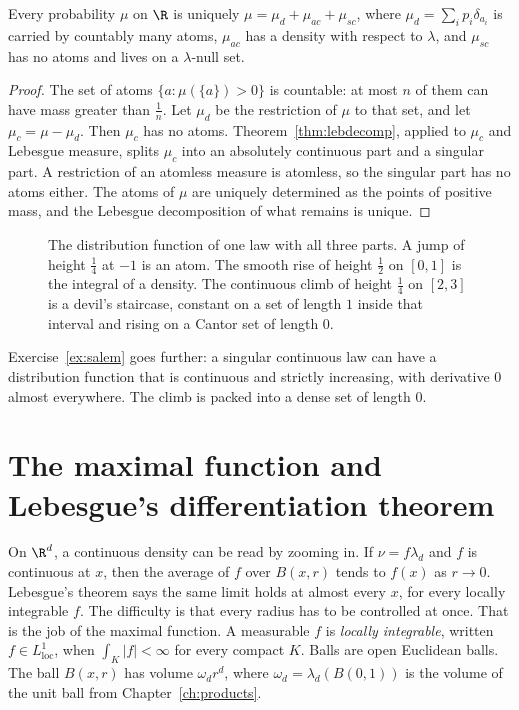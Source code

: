 \begin{corollary}\label{cor:threeparts}
Every probability $\mu$ on $\R$ is uniquely $\mu=\mu_d+\mu_{ac}+\mu_{sc}$, where $\mu_d=\sum_ip_i\delta_{a_i}$ is carried by countably many atoms, $\mu_{ac}$ has a density with respect to $\lambda$, and $\mu_{sc}$ has no atoms and
lives on a $\lambda$-null set.
\end{corollary}
\begin{proof}
The set of atoms $\{a:\mu(\{a\})>0\}$ is countable: at most $n$ of them can have mass greater than $\frac1n$. Let $\mu_d$ be the restriction of $\mu$ to that set, and let $\mu_c=\mu-\mu_d$. Then $\mu_c$ has no atoms. Theorem~\ref{thm:lebdecomp}, applied to $\mu_c$ and Lebesgue measure, splits $\mu_c$ into an absolutely continuous part and a singular part. A restriction of an atomless measure is atomless, so the singular part has no atoms either. The atoms of $\mu$ are uniquely determined as the points of positive mass, and the Lebesgue decomposition of what remains is unique.
\end{proof}

\begin{figure}[ht]
\centering
{}
\caption{The distribution function of one law with all three parts. A jump of height $\frac14$ at $-1$ is an atom. The smooth rise of height $\frac12$ on $[0,1]$ is the integral of a density. The continuous climb of height $\frac14$ on $[2,3]$ is a devil's staircase, constant on a set of length $1$ inside that interval and rising on a Cantor set of length $0$.}
\label{fig:threeparts}
\end{figure}

Exercise~\ref{ex:salem} goes further: a singular continuous law can have a distribution function that is continuous and strictly increasing, with derivative $0$ almost everywhere. The climb is packed into a dense set of length $0$.

\section{The maximal function and Lebesgue's differentiation theorem}

On $\R^d$, a continuous density can be read by zooming in. If $\nu=f\lambda_d$ and $f$ is continuous at $x$, then the average of $f$ over $B(x,r)$ tends to $f(x)$ as $r\to0$. Lebesgue's theorem says the same limit holds at almost every $x$, for every locally integrable $f$. The difficulty is that every radius has to be controlled at once. That is the job of the maximal function. A measurable $f$ is \emph{locally integrable}, written $f\in L^1_{\mathrm{loc}}$, when $\int_K|f|<\infty$ for every compact $K$. Balls are open Euclidean balls. The ball $B(x,r)$ has volume $\omega_dr^d$, where $\omega_d=\lambda_d(B(0,1))$ is the volume of the unit ball from Chapter~\ref{ch:products}.


